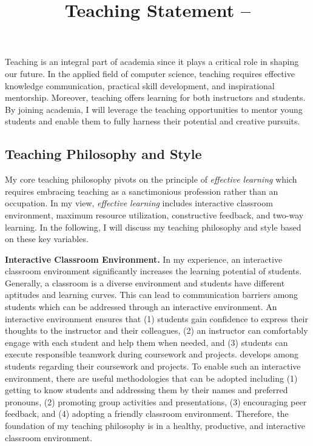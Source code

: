 \documentclass{NSF}
\newcommand{\BfPara}[1]{{\noindent\textbf{#1.}}\xspace}
\begin{document}
\title{Teaching Statement -- }
\thispagestyle{empty}
Teaching is an integral part of academia since it plays a critical role in shaping our future. In the applied field of computer science, teaching requires effective knowledge communication, practical skill development, and inspirational mentorship. Moreover, teaching offers learning for both instructors and students. By joining academia, I will leverage the teaching opportunities to mentor young students and enable them to fully harness their potential and creative pursuits.  


\subsection*{Teaching Philosophy and Style}
My core teaching philosophy pivots on the principle of {\em effective learning} which requires embracing teaching as a sanctimonious profession rather than an occupation. In my view, {\em effective learning} includes interactive classroom environment, maximum resource utilization, constructive feedback, and two-way learning. In the following, I will discuss my teaching philosophy and style based on these key variables.   



\BfPara{Interactive Classroom Environment} In my experience, an interactive classroom environment significantly increases the learning potential of students. Generally, a classroom is a diverse environment and students have different aptitudes and learning curves. This can lead to communication barriers among students which can be addressed through an interactive environment. An interactive environment ensures that (1) students gain confidence to express their thoughts to the instructor and their colleagues, (2) an instructor can comfortably engage with each student and help them when needed, and (3) students can execute responsible teamwork during coursework and projects.  develops among students regarding their coursework and projects. To enable such an interactive environment, there are useful methodologies that can be adopted including (1) getting to know students and addressing them by their names and preferred pronouns, (2) promoting group activities and presentations, (3) encouraging peer feedback, and (4) adopting a friendly classroom environment. Therefore, the foundation of my teaching philosophy is in a healthy, productive, and interactive classroom environment. 
\end{document}

